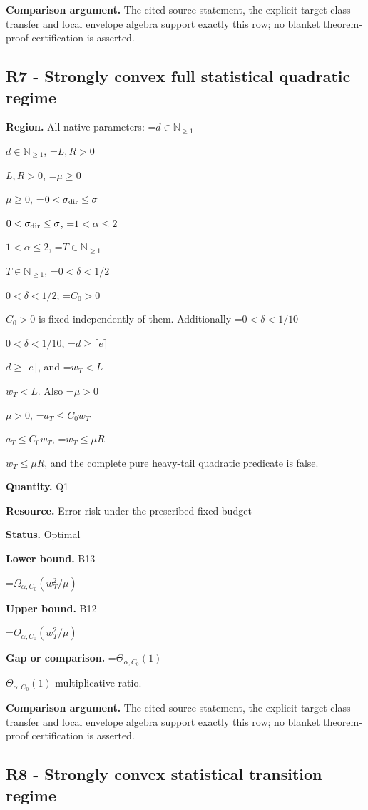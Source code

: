 \documentclass[10pt,a4paper]{article}
\newcommand{\AtlasMath}[1]{\par\begingroup\centering\setbox0=\hbox{$\displaystyle #1$}\ifdim\wd0>1.4\linewidth\typeout{ATLAS WIDE FORMULA: \the\wd0}\fi\ifdim\wd0>\linewidth\resizebox{\linewidth}{!}{\box0}\else\box0\fi\par\endgroup}
\newcommand{\AtlasInlineMath}[1]{\begingroup\setbox0=\hbox{$#1$}\ifdim\wd0>.4\linewidth\endgroup\AtlasMath{#1}\else\endgroup$#1$\fi}
\begin{document}
\textbf{Comparison argument.} The cited source statement, the explicit target-class transfer and local envelope algebra support exactly this row; no blanket theorem-proof certification is asserted.



\subsection{R7 - Strongly convex full statistical quadratic regime}


\textbf{Region.} All native parameters: \AtlasInlineMath{d\in\mathbb N_{\ge1}}, \AtlasInlineMath{L,R>0}, \AtlasInlineMath{\mu\ge0}, \AtlasInlineMath{0<\sigma_{\rm dir}\le\sigma}, \AtlasInlineMath{1<\alpha\le2}, \AtlasInlineMath{T\in\mathbb N_{\ge1}}, \AtlasInlineMath{0<\delta<1/2}; \AtlasInlineMath{C_0>0} is fixed independently of them. Additionally \AtlasInlineMath{0<\delta<1/10}, \AtlasInlineMath{d\ge\lceil e\rceil}, and \AtlasInlineMath{w_T<L}. Also \AtlasInlineMath{\mu>0}, \AtlasInlineMath{a_T\le C_0w_T}, \AtlasInlineMath{w_T\le\mu R}, and the complete pure heavy-tail quadratic predicate is false.



\textbf{Quantity.} Q1



\textbf{Resource.} Error risk under the prescribed fixed budget



\textbf{Status.} Optimal



\textbf{Lower bound.} B13



\AtlasMath{\Omega_{\alpha,C_0}\!\left(w_T^2/\mu\right)}


\textbf{Upper bound.} B12



\AtlasMath{O_{\alpha,C_0}\!\left(w_T^2/\mu\right)}


\textbf{Gap or comparison.} \AtlasInlineMath{\Theta_{\alpha,C_0}(1)} multiplicative ratio.



\textbf{Comparison argument.} The cited source statement, the explicit target-class transfer and local envelope algebra support exactly this row; no blanket theorem-proof certification is asserted.



\subsection{R8 - Strongly convex statistical transition regime}
\end{document}
